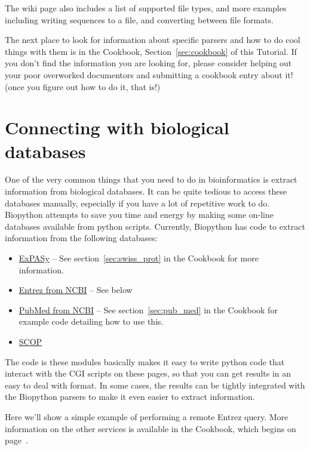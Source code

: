 \documentclass{report}
\begin{document}
The wiki page also includes a list of supported file types, and more examples including writing sequences to a file, and converting between file formats.

The next place to look for information about specific parsers and how to do cool things with them is in the Cookbook, Section~\ref{sec:cookbook} of this Tutorial. If you don't find the information you are looking for, please consider helping out your poor overworked documentors and submitting a cookbook entry about it! (once you figure out how to do it, that is!)


\section{Connecting with biological databases}
\label{sec:connecting-with-biological-databases}

One of the very common things that you need to do in bioinformatics is extract information from biological databases. It can be quite tedious to access these databases manually, especially if you have a lot of repetitive work to do. Biopython attempts to save you time and energy by making some on-line databases available from python scripts. Currently, Biopython has code to extract information from the following databases:

\begin{itemize}
  \item \href{http://www.expasy.org/}{ExPASy} -- See section~\ref{sec:swiss_prot} in the Cookbook for more information.
  \item \href{http://www.ncbi.nlm.nih.gov/Entrez/}{Entrez from NCBI} -- See below
  \item \href{http://www.ncbi.nlm.nih.gov/PubMed/}{PubMed from NCBI} -- See section~\ref{sec:pub_med} in the Cookbook for example code detailing how to use this.
  \item \href{http://scop.mrc-lmb.cam.ac.uk/scop/}{SCOP}
\end{itemize}

The code is these modules basically makes it easy to write python code that interact with the CGI scripts on these pages, so that you can get results in an easy to deal with format. In some cases, the results can be tightly integrated with the Biopython parsers to make it even easier to extract information.


Here we'll show a simple example of performing a remote Entrez query. More information on the other services is available in the Cookbook, which begins on page~\pageref{sec:cookbook}.
\end{document}
